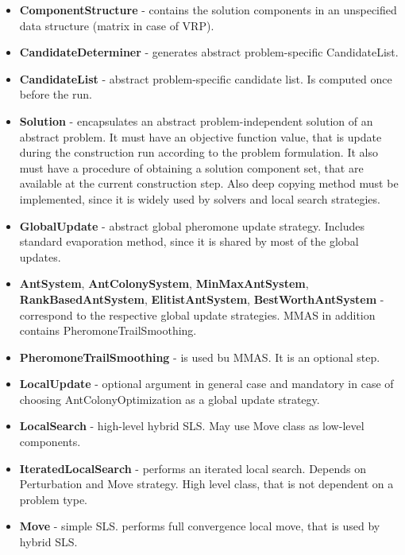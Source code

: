 \documentclass[11pt,a4paper,oneside]{book}
\begin{document}
\begin{itemize}
\item \textbf{ComponentStructure} - contains the solution components in an unspecified data structure (matrix in case of VRP).

\item \textbf{CandidateDeterminer} - generates abstract problem-specific CandidateList.

\item \textbf{CandidateList} - abstract problem-specific candidate list. Is computed once before the run.

\item \textbf{Solution} - encapsulates an abstract problem-independent solution of an abstract problem. It must have an objective function value, that is update during the construction run according to the problem formulation. It also must have a procedure of obtaining a solution component set, that are available at the current construction step. Also deep copying method must be implemented, since it is widely used by solvers and local search strategies.

\item \textbf{GlobalUpdate} - abstract global pheromone update strategy. Includes standard evaporation method, since it is shared by most of the global updates.

\item \textbf{AntSystem}, \textbf{AntColonySystem}, \textbf{MinMaxAntSystem}, \textbf{RankBasedAntSystem}, \textbf{ElitistAntSystem}, \textbf{BestWorthAntSystem} - correspond to the respective global update strategies. MMAS in addition contains PheromoneTrailSmoothing.

\item \textbf{PheromoneTrailSmoothing} - is used bu MMAS. It is an optional step.

\item \textbf{LocalUpdate} - optional argument in general case and mandatory in case of choosing AntColonyOptimization as a global update strategy.

\item \textbf{LocalSearch} - high-level hybrid SLS. May use Move class as low-level components.

\item \textbf{IteratedLocalSearch} - performs an iterated local search. Depends on Perturbation and Move strategy. High level class, that is not dependent on a problem type.

\item \textbf{Move} - simple SLS. performs full convergence local move, that is used by hybrid SLS.


\end{itemize}
\end{document}
